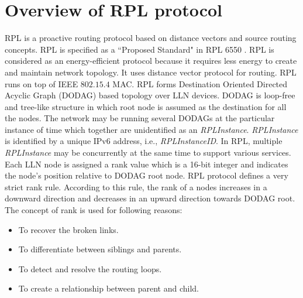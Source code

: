 \documentclass[conference, a4paper]{IEEEtran}
\begin{document}
\section{\textbf{Overview of RPL protocol}}\label{Sec:Overview of RPL protocol}
RPL is a proactive routing protocol based on distance vectors and source routing concepts. RPL is specified as a ``Proposed Standard" in RPL 6550 \cite{rfc6550}. RPL is considered as an energy-efficient protocol because it requires less energy to create and maintain network topology\cite{gaddour2012rpl}. It uses distance vector protocol for routing. RPL runs on top of IEEE $ 802.15.4 $ MAC. RPL forms Destination Oriented Directed Acyclic Graph (DODAG) based topology over LLN devices. DODAG is loop-free and tree-like structure in which root node is assumed as the destination for all the nodes. The network may be running several DODAGs at the particular instance of time which together are unidentified as an \textit{RPLInstance}. \textit{RPLInstance} is identified by a unique IPv6 address, i.e.,  \textit{RPLInstanceID}. In RPL, multiple \textit{RPLInstance} may be concurrently at the same time to support various services. Each LLN node is assigned a rank value which is a 16-bit integer and indicates the node's position relative to DODAG root node. RPL protocol defines a very strict rank rule. According to this rule, the rank of a nodes increases in a downward direction and decreases in an upward direction towards DODAG root. 
The concept of rank is used for following reasons: 

\begin{itemize}
    \item To recover the broken links.
    \item To differentiate between siblings and parents.
    \item To detect and resolve the routing loops.
    \item To create a relationship between parent and child.  
\end{itemize}
\end{document}
